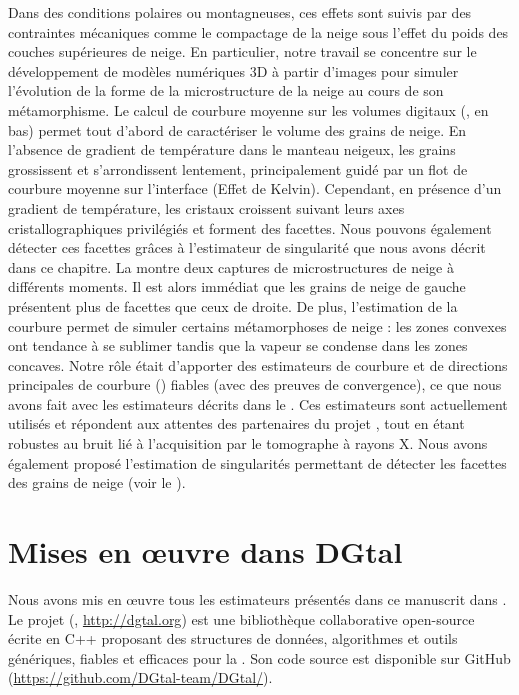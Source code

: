 Dans des conditions polaires ou montagneuses, ces effets sont suivis par des
contraintes mécaniques comme le compactage de la neige sous l'effet du poids des
couches supérieures de neige. En particulier, notre travail se concentre sur le
développement de modèles numériques 3D à partir d'images pour simuler
l'évolution de la forme de la microstructure de la neige au cours de son
métamorphisme. Le calcul de courbure moyenne sur les volumes digitaux
(, en bas) permet tout d'abord de caractériser
le volume des grains de neige. En l'absence de gradient de température dans le
manteau neigeux, les grains grossissent et s'arrondissent lentement,
principalement guidé par un flot de courbure moyenne sur l'interface (Effet de
Kelvin). Cependant, en présence d'un gradient de température, les cristaux
croissent suivant leurs axes cristallographiques privilégiés et forment des
facettes. Nous pouvons également détecter ces facettes grâces à l'estimateur de
singularité que nous avons décrit dans ce chapitre. La
 montre deux captures de microstructures de
neige à différents moments. Il est alors immédiat que les grains de neige de
gauche présentent plus de facettes que ceux de droite. De plus, l'estimation de
la courbure permet de simuler certains métamorphoses de neige : les zones
convexes ont tendance à se sublimer tandis que la vapeur se condense dans les
zones concaves. Notre rôle était d'apporter des estimateurs de courbure et de
directions principales de courbure ()
fiables (\cad avec des preuves de convergence), ce que nous avons fait
avec les estimateurs décrits dans le . Ces
estimateurs sont actuellement utilisés et répondent aux attentes des partenaires
du projet \digitalSnow, tout en étant robustes au bruit lié à l'acquisition par
le tomographe à rayons X. Nous avons également proposé l'estimation de
singularités permettant de détecter les facettes des grains de neige (voir le
).

\section{Mises en œuvre dans DGtal}%
\label{sec:applications:dgtal}
%
Nous avons mis en œuvre tous les estimateurs présentés dans ce manuscrit dans
\DGtal \cite{DGtal}. Le projet \DGtal (,
\url{http://dgtal.org}) est une bibliothèque collaborative open-source écrite en
\textsc{C++} proposant des structures de données, algorithmes et outils
génériques, fiables et efficaces pour la \DigitalGeometry. Son code source est
disponible sur GitHub (\url{https://github.com/DGtal-team/DGtal/}).


